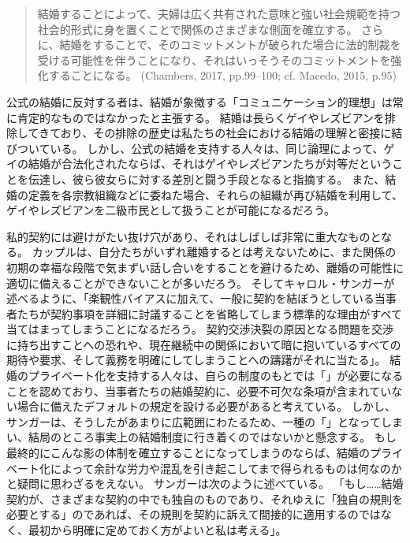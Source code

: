 \documentclass[paper=a4,book,openany]{jlreq}
\newcommand{\ig}[1]{}           %
\begin{document}
\begin{quote}
結婚することによって、夫婦は広く共有された意味と強い社会規範を持つ社会的形式に身を置くことで関係のさまざまな側面を確立する。
さらに、結婚をすることで、そのコミットメントが破られた場合に法的制裁を受ける可能性を伴うことになり、それはいっそうそのコミットメントを強化することになる。
(Chambers, 2017, pp.99--100; cf. Macedo, 2015, p.95) \nocite{chambers17:againstmarriage} \nocite{macedo15:_just_married}\ig{Clare chmbers}
\end{quote}

公式の結婚に反対する者は、結婚が象徴する「コミュニケーション的理想」は常に肯定的なものではなかったと主張する。
結婚は長らくゲイやレズビアンを排除してきており、その排除の歴史は私たちの社会における結婚の理解と密接に結びついている。
しかし、公式の結婚を支持する人々は、同じ論理によって、ゲイの結婚が合法化されたならば、それはゲイやレズビアンたちが対等だということを伝達し、彼ら彼女らに対する差別と闘う手段となると指摘する。
また、結婚の定義を各宗教組織などに委ねた場合、それらの組織が再び結婚を利用して、ゲイやレズビアンを二級市民として扱うことが可能になるだろう\citep[cf.][p.205]{hartley12:_polit_liber_marriag_famil}。

私的契約には避けがたい抜け穴があり、それはしばしば非常に重大なものとなる。
カップルは、自分たちがいずれ離婚するとは考えないために、また関係の初期の幸福な段階で気まずい話し合いをすることを避けるため、離婚の可能性に適切に備えることができないことが多いだろう。
そしてキャロル・サンガーが述べるように、「楽観性バイアスに加えて、一般に契約を結ぼうとしている当事者たちが契約事項を詳細に討議することを省略してしまう標準的な理由がすべて当てはまってしまうことになるだろう。
契約交渉決裂の原因となる問題を交渉に持ち出すことへの恐れや、現在継続中の関係において暗に抱いているすべての期待や要求、そして義務を明確にしてしまうことへの躊躇がそれに当たる」\citep[p.1315]{sanger06:_case_civil_marriag}。
結婚のプライベート化を支持する人々は、自らの制度のもとでは「」が必要になることを認めており、当事者たちの結婚契約に、必要不可欠な条項が含まれていない場合に備えたデフォルトの規定を設ける必要があると考えている。
しかし、サンガーは、そうしたがあまりに広範囲にわたるため、一種の「」となってしまい、結局のところ事実上の結婚制度に行き着くのではないかと懸念する。
もし最終的にこんな影の体制を確立することになってしまうのならば、結婚のプライベート化によって余計な労力や混乱を引き起こしてまで得られるものは何なのかと疑問に思わざるをえない。
サンガーは次のように述べている。
「もし……結婚契約が、さまざまな契約の中でも独自のものであり、それゆえに「独自の規則を必要とする」のであれば、その規則を契約に訴えて間接的に適用するのではなく、最初から明確に定めておく方がよいと私は考える」\citep[p.1315]{sanger06:_case_civil_marriag}。
\end{document}
